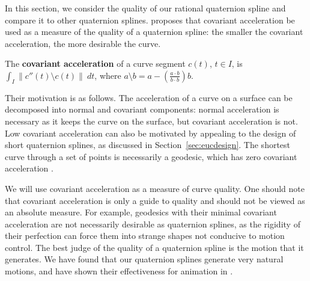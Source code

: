 In this section, we consider the quality of our rational quaternion
spline and compare it to other quaternion splines.
\cite{barr92} proposes that covariant acceleration
be used as a measure of the quality of a quaternion spline:
the smaller the covariant acceleration, the more desirable the curve.
%
\begin{defn2}
The {\bf covariant acceleration} of a curve segment $c(t)$, $t \in I$, is 
$\int_I \| c''(t) \setminus c(t)\| \ dt$, where
$a \setminus b = a - (\frac{a \cdot b}{b \cdot b}) b$.
\end{defn2}
%
Their motivation is as follows.
The acceleration of a curve on a surface can be decomposed into
normal and covariant components: normal acceleration is necessary
as it keeps the curve on the surface, but covariant acceleration
is not.
%
Low covariant acceleration can also be motivated by appealing to the 
design of short quaternion splines, as discussed in 
Section~\ref{sec:eucdesign}.
The shortest curve through a set of points is necessarily a geodesic,
which has zero covariant acceleration \cite{thorpe79}.
	
We will use covariant acceleration as a measure of curve quality.
One should note that covariant acceleration is only a guide to quality
and should not be viewed as an absolute measure.
For example, geodesics with their minimal covariant acceleration
are not necessarily desirable as quaternion splines, as
the rigidity of their perfection can force them into strange shapes
not conducive to motion control.
The best judge of the quality of a quaternion spline
is the motion that it generates.
We have found that our quaternion splines generate very natural motions,
and have shown their effectiveness for animation in \cite{jjjw95}.

